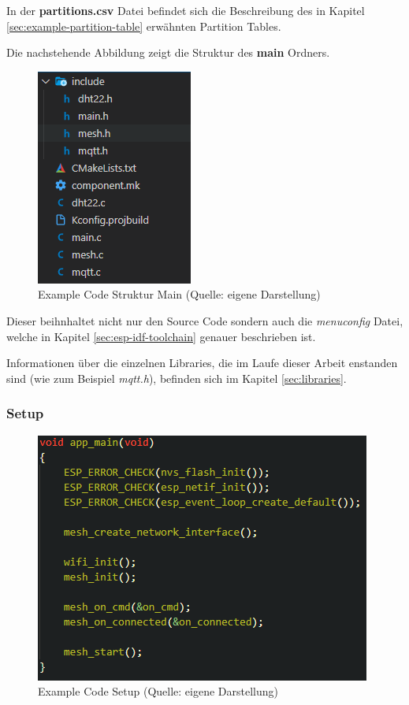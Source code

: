 In der \textbf{partitions.csv} Datei befindet sich die Beschreibung des in Kapitel \ref{sec:example-partition-table} erwähnten Partition Tables.

Die nachstehende Abbildung zeigt die Struktur des \textbf{main} Ordners.

\begin{figure}[H]
    \begin{center}
        \includegraphics[scale=0.8]{images/example_code_structure_main.png}
        \caption{Example Code Struktur Main (Quelle: eigene Darstellung)}
        \label{abb:example_code_structure_main}
    \end{center}
\end{figure}

Dieser beihnhaltet nicht nur den Source Code sondern auch die \textit{menuconfig} Datei, welche in Kapitel \ref{sec:esp-idf-toolchain} genauer beschrieben ist.

Informationen über die einzelnen Libraries, die im Laufe dieser Arbeit enstanden sind (wie zum Beispiel \textit{mqtt.h}), befinden sich im Kapitel \ref{sec:libraries}.

\subsubsection{Setup}

\begin{figure}[H]
    \begin{center}
        \includegraphics[scale=0.8]{images/example_code_setup.png}
        \caption{Example Code Setup (Quelle: eigene Darstellung)}
        \label{abb:example_code_setup}
    \end{center}
\end{figure}

